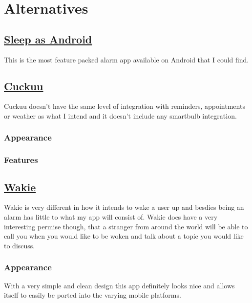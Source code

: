 \section{Alternatives}\label{alternatives}

\subsection{\texorpdfstring{\href{http://sleep.urbandroid.org/}{Sleep as
Android}}{Sleep as Android}}\label{sleep-as-android}

This is the most feature packed alarm app available on Android that I
could find.

\subsection{\texorpdfstring{\href{https://cuckuu.com/}{Cuckuu}}{Cuckuu}}\label{cuckuu}

Cuckuu doesn't have the same level of integration with reminders,
appointments or weather as what I intend and it doesn't include any
smartbulb integration.

\subsubsection{Appearance}\label{appearance}

\subsubsection{Features}\label{features}

\subsection{\texorpdfstring{\href{https://wakie.com/}{Wakie}}{Wakie}}\label{wakie}

Wakie is very different in how it intends to wake a user up and besdies
being an alarm has little to what my app will consist of. Wakie does
have a very interesting permise though, that a stranger from around the
world will be able to call you when you would like to be woken and talk
about a topic you would like to discuss.

\subsubsection{Appearance}\label{appearance-1}

With a very simple and clean design this app definitely looks nice and
allows itself to easily be ported into the varying mobile platforms.

